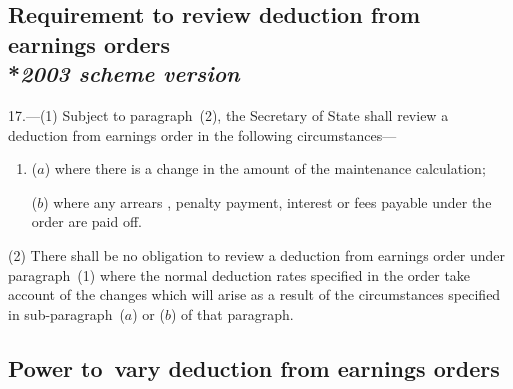 \documentclass[12pt,a4paper]{article}
\begin{document}
\subsection[17. Requirement to review deduction from earnings orders --- \emph{2003 scheme version}]{Requirement to review deduction from earnings orders\\*\emph{2003 scheme version}}

%

17.—(1) Subject to paragraph~(2), the Secretary of State shall review a deduction from earnings order in the following circumstances—
\begin{enumerate}\item[]
($a$) where there is a change in the amount of the maintenance 
calculation;  %

($b$) where any arrears%
, penalty payment, interest or fees  %
payable under the order are paid off.
\end{enumerate}

(2) There shall be no obligation to review a deduction from earnings order under paragraph~(1) where the normal deduction rates specified in the order take account of the changes which will arise as a result of the circumstances specified in sub-paragraph~($a$) or ($b$) of that paragraph.


\subsection[18. Power to~vary deduction from earnings orders]{Power to~vary deduction from earnings orders}
\end{document}
